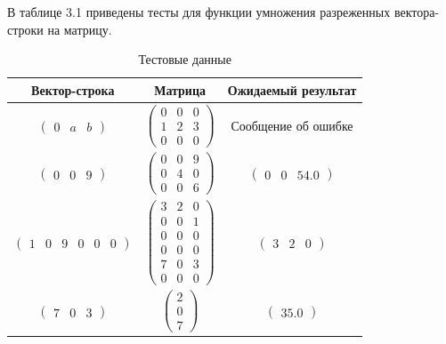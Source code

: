 В таблице 3.1 приведены тесты для функции умножения разреженных вектора-строки на матрицу.

\begin{table}
	\begin{center}
		\begin{tabular}{|c|c|c|}
			\hline
			Вектор-строка & Матрица & Ожидаемый результат \\
			\hline
			$\begin{pmatrix}
			0 & a & b
			\end{pmatrix}$ &
			$\begin{pmatrix}
			0 & 0 & 0 \\
			1 & 2 & 3 \\
			0 & 0 & 0
			\end{pmatrix}$ &
			Сообщение об ошибке \\
			\hline
			$\begin{pmatrix}
			0 & 0 & 9
			\end{pmatrix}$ &
			$\begin{pmatrix}
			0 & 0 & 9 \\
			0 & 4 & 0 \\
			0 & 0 & 6
			\end{pmatrix}$ &
			$\begin{pmatrix}
			0 & 0 & 54.0
			\end{pmatrix}$ \\
			\hline
			$\begin{pmatrix}
			1 & 0 & 9 & 0 & 0 & 0
			\end{pmatrix}$ &
			$\begin{pmatrix}
			3 & 2 & 0 \\
			0 & 0 & 1 \\
			0 & 0 & 0 \\
			0 & 0 & 0 \\
			7 & 0 & 3 \\
			0 & 0 & 0
			\end{pmatrix}$ &
			$\begin{pmatrix}
			3 & 2 & 0
			\end{pmatrix}$ \\
			\hline
			$\begin{pmatrix}
			7 & 0 & 3
			\end{pmatrix}$ &
			$\begin{pmatrix}
			2 \\
			0 \\
			7
			\end{pmatrix}$ &
			$\begin{pmatrix}
			35.0
			\end{pmatrix}$ \\
			\hline
		\end{tabular}
	\end{center}
	\caption{Тестовые данные}
\end{table}

